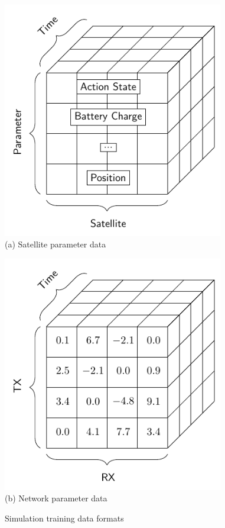 \documentclass[conference]{IEEEtran}
\begin{document}
\begin{figure}[t]
  \begin{minipage}[b]{0.49\linewidth}
    \begin{center}
      \includegraphics[width=0.86\textwidth]{images/params.pdf} \\
      {\footnotesize(a) Satellite parameter data}
    \end{center}
  \end{minipage}
  \begin{minipage}[b]{0.49\linewidth}
    \begin{center}
      \includegraphics[width=0.86\textwidth]{images/weighted.pdf} \\
      {\footnotesize(b) Network parameter data}
    \end{center}
  \end{minipage}
  \caption{Simulation training data formats}
  \label{fig:data}
\end{figure}
\end{document}

